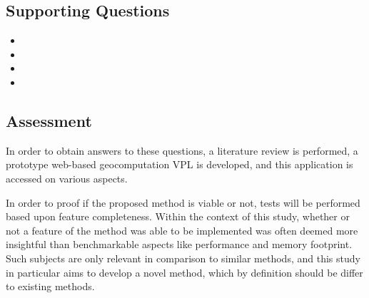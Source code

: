 \subsection*{Supporting Questions}

\begin{itemize}[-]
\item \myNewSubRQOne
\item \myNewSubRQTwo
\item \myNewSubRQThree
\item \myNewSubRQFour
\end{itemize}

\subsection*{Assessment}
In order to obtain answers to these questions, a literature review is performed,
a prototype web-based geocomputation VPL is developed, 
and this application is accessed on various aspects.

In order to proof if the proposed method is viable or not, tests will be performed based upon feature completeness.
Within the context of this study, whether or not a feature of the method was able to be implemented was often deemed 
more insightful than benchmarkable aspects like performance and memory footprint.  
Such subjects are only relevant in comparison to similar methods, and this study in particular aims to develop a novel method, 
which by definition should be differ to existing methods. 









